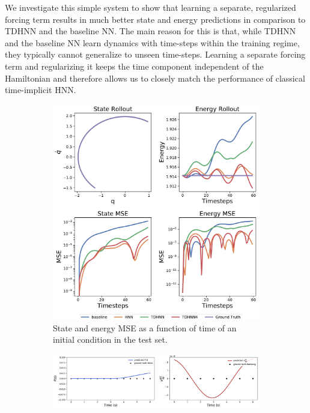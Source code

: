\documentclass{article}
\begin{document}
We investigate this simple system to show that learning a separate, regularized forcing term results in much better state and energy predictions in comparison to TDHNN and the baseline NN. The main reason for this is that, while TDHNN and the baseline NN learn dynamics with time-steps within the training regime, they typically cannot generalize to unseen time-steps. Learning a separate forcing term and regularizing it keeps the time component independent of the Hamiltonian and therefore allows us to closely match the performance of classical time-implicit HNN.

\begin{figure}[h!]
\centering
\captionsetup{justification=centering}
	\begin{subfigure}[b]{0.4\textwidth}
		\centering
		\includegraphics[width=\textwidth, trim={0 0 0 12cm},clip]{figures/figures/mass_spring/1/mass_spring_long_0.pdf}
		\caption{State and energy MSE as a function of time of an initial condition in the test set.}
	\end{subfigure}
	\begin{subfigure}[b]{0.48\textwidth}
		\centering
		\includegraphics[width=\textwidth]{figures/figures/mass_spring/1/mass_spring_dpdt_new_0.pdf}

\end{subfigure}
\end{figure}
\end{document}
